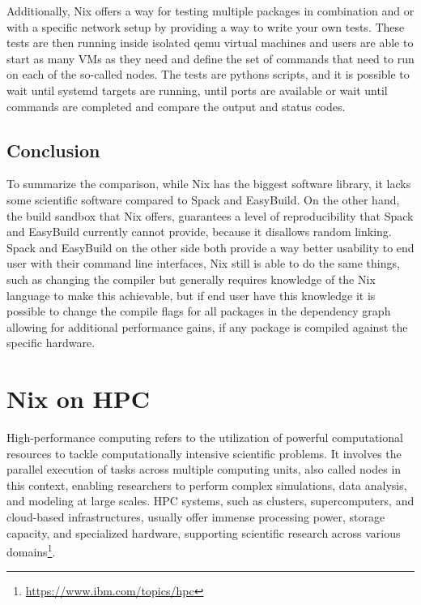 \documentclass{eceasst}
\begin{document}
Additionally, Nix offers a way for testing multiple packages in combination and or with a specific network setup by providing a way to write your own tests.
These tests are then running inside isolated qemu virtual machines and users are able to start as many VMs as they need and define the set of commands that need to run on each of the so-called nodes.
The tests are pythons scripts, and it is possible to wait until systemd targets are running, until ports are available or wait until commands are completed and compare the output and status codes.

\subsection{Conclusion}

To summarize the comparison, while Nix has the biggest software library, it lacks some scientific software compared to Spack and EasyBuild.
On the other hand, the build sandbox that Nix offers, guarantees a level of reproducibility that Spack and EasyBuild currently cannot provide, because it disallows random linking.
Spack and EasyBuild on the other side both provide a way better usability to end user with their command line interfaces, Nix still is able to do the same things, such as changing the compiler but generally requires knowledge of the Nix language to make this achievable, but if end user have this knowledge it is possible to change the compile flags for all packages in the dependency graph allowing for additional performance gains, if any package is compiled against the specific hardware.

\section{Nix on HPC}\label{sec:nix-on-hpc}

High-performance computing refers to the utilization of powerful computational resources to tackle computationally intensive scientific problems.
It involves the parallel execution of tasks across multiple computing units, also called nodes in this context, enabling researchers to perform complex simulations, data analysis, and modeling at large scales.
HPC systems, such as clusters, supercomputers, and cloud-based infrastructures, usually offer immense processing power, storage capacity, and specialized hardware, supporting scientific research across various domains\footnote{\url{https://www.ibm.com/topics/hpc}}.
\end{document}
